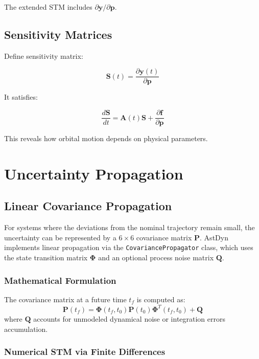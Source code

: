 The extended STM includes $\partial\mathbf{y}/\partial\mathbf{p}$.

\subsection{Sensitivity Matrices}

Define sensitivity matrix:

\begin{equation}
    \mathbf{S}(t) = \frac{\partial\mathbf{y}(t)}{\partial\mathbf{p}}
\end{equation}

It satisfies:

\begin{equation}
    \frac{d\mathbf{S}}{dt} = \mathbf{A}(t)\mathbf{S} + \frac{\partial\mathbf{f}}{\partial\mathbf{p}}
\end{equation}

This reveals how orbital motion depends on physical parameters.

\section{Uncertainty Propagation}

\subsection{Linear Covariance Propagation}

For systems where the deviations from the nominal trajectory remain small, the uncertainty can be represented by a $6 \times 6$ covariance matrix $\mathbf{P}$. AstDyn implements linear propagation via the \texttt{CovariancePropagator} class, which uses the state transition matrix $\mathbf{\Phi}$ and an optional process noise matrix $\mathbf{Q}$.

\subsubsection{Mathematical Formulation}

The covariance matrix at a future time $t_f$ is computed as:
\begin{equation}
    \mathbf{P}(t_f) = \mathbf{\Phi}(t_f, t_0) \mathbf{P}(t_0) \mathbf{\Phi}^T(t_f, t_0) + \mathbf{Q}
\end{equation}
where $\mathbf{Q}$ accounts for unmodeled dynamical noise or integration errors accumulation.

\subsubsection{Numerical STM via Finite Differences}

